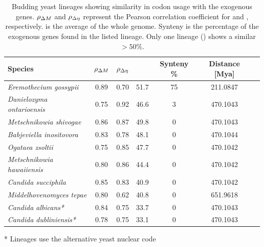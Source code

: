 \documentclass[fleqn,letterpaper]{article}
\begin{document}
\begin{table}
  \centering
  \caption{Budding yeast lineages showing similarity in codon usage with the exogenous genes.
  $\rho_{\Delta M}$ and $\rho_{\Delta \eta}$ represent the Pearson correlation coefficient for \DM and \DE, respectively.
  \GC is the average \GC of the whole genome.
  Synteny is the percentage of the exogenous genes found in the listed lineage.
  Only one lineage (\gossypii) shows a similar \GC $> 50 \%$.}
  \begin{threeparttable}
  	\begin{tabular}{lcccccc}
    		\hline
    		Species & $\rho_{\Delta M}$ & $\rho_{\Delta \eta}$ & \GC & Synteny \%&  Distance [Mya] \\ \hline 
    		\emph{Eremothecium gossypii}			& 0.89 & 0.70 & 51.7 & 75 & 211.0847 \\
    		\emph{Danielozyma ontarioensis}			& 0.75 & 0.92 & 46.6 & 3   & 470.1043 \\
    		\emph{Metschnikowia shivogae}			& 0.86 & 0.87 & 49.8 & 0   & 470.1043 \\
    		\emph{Babjeviella inositovora}			& 0.83 & 0.78 & 48.1 & 0   & 470.1044 \\
    		\emph{Ogataea zsoltii}					& 0.75 & 0.85 & 47.7 & 0   & 470.1042 \\ 
    		\emph{Metschnikowia hawaiiensis}		& 0.80 & 0.86 & 44.4 & 0   & 470.1042 \\
    		\emph{Candida succiphila}	       			& 0.85 & 0.83 & 40.9 & 0   & 470.1042 \\ 
    		\emph{Middelhovenomyces tepae}		& 0.80 & 0.62 & 40.8 & 0   & 651.9618 \\ 
    		\emph{Candida albicans*}		   		& 0.84 & 0.75 & 33.7 & 0   & 470.1043 \\
   		\emph{Candida dubliniensis*}               		& 0.78 & 0.75 & 33.1 & 0   & 470.1043 \\ \hline
  	\end{tabular}
  	\begin{tablenotes}
    		\item[*] Lineages use the alternative yeast nuclear code %
 	 \end{tablenotes}
  \end{threeparttable}  
  \label{tab:source}
\end{table}
\end{document}
